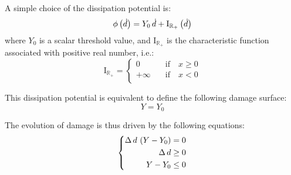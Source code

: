 A simple choice of the dissipation potential is:
%
%
%
\begin{equation}
  \label{eq:micromorphicdamage:dissipationpotential}
  \begin{aligned}
    \phi\left(\dot{d}\right) = Y_{0}\,\dot{d}+ \mathrm{I}_{\mathbb{R}_{+}}\left(\dot{d}\right) 
  \end{aligned}
\end{equation}
%
%
%
where $Y_0$ is a scalar threshold value, and \(\mathrm{I}_{\mathbb{R}_{+}}\) is the characteristic function associated with positive real number, i.e.:
%
%
%
\begin{equation}
  \mathrm{I}_{\mathbb{R}_{+}}=
  \left\{
  \begin{aligned}
  0 &\quad\text{if}\quad x\geq 0 \\
  +\infty &\quad\text{if}\quad x< 0 \\
  \end{aligned}
  \right.
\end{equation}

This dissipation potential is equivalent to define the following damage surface:
%
%
%
\begin{equation}
  \label{eq:micromorphicdamage:yield}
  Y = Y_{0}
\end{equation}

The evolution of damage is thus driven by the following equations:
%
%
%
\begin{equation}
  \label{eq:micromorphicdamage:KTT}
  \left\{
  \begin{aligned}
  \Delta\,d\,\left(Y - Y_{0}\right)&=0\\
  \Delta\,d&\geq 0\\
  Y - Y_{0}&\leq 0
  \end{aligned}
  \right.
\end{equation}

